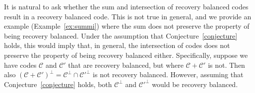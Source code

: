 \documentclass[11pt,a4paper,reqno,twoside]{amsart}
\theoremstyle{definition}
\newtheorem{corollary}{Corollary}
\newcommand{\mC}{\mathcal{C}}
\newcommand{\pcomment}[1]{{\color{purple}#1}}
\newcommand{\gcomment}[1]{{\color{OliveGreen}#1}}
\newcommand{\db}[1]{{\footnotesize [\pcomment{#1}\;\;\gcomment{--Daniella}]}}
\begin{document}



It is natural to ask whether the sum and intersection of recovery balanced codes result in a recovery balanced code. This is not true in general, and we provide an example (Example~\ref{ex:summi}) where the sum does not preserve the property of being recovery balanced. Under the assumption that Conjecture~\ref{conjecture} holds, this would imply that, in general, the intersection of codes does not preserve the property of being recovery balanced either. Specifically, suppose we have codes $\mC$ and $\mC'$ that are recovery balanced, but where $\mC + \mC'$ is not. Then also $(\mC + \mC')^\perp = \mC^\perp \cap \mC'^\perp$ is not recovery balanced. However, assuming that Conjecture~\ref{conjecture} holds, both $\mC^\perp$ and $\mC'^\perp$ would be recovery balanced.
\end{document}
